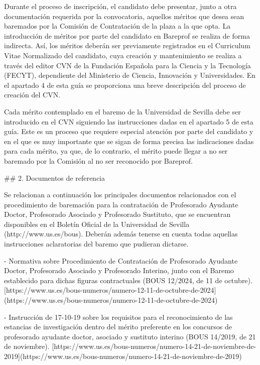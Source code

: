 \documentclass{article}
\begin{document}
\begin{itemize}
\begin{itemize}
\begin{scriptsize}
                  Durante el proceso de inscripción, el candidato debe presentar, junto a otra documentación requerida por la convocatoria, aquellos méritos que desea sean baremados por la Comisión de Contratación de la plaza a la que opta. La introducción de méritos por parte del candidato en Bareprof se realiza de forma indirecta. Así, los méritos deberán ser previamente registrados en el Curriculum Vitae Normalizado del candidato, cuya creación y mantenimiento se realiza a través del editor CVN de la Fundación Española para la Ciencia y la Tecnología (FECYT), dependiente del Ministerio de Ciencia, Innovación y Universidades. En el apartado 4 de esta guía se proporciona una breve descripción del proceso de creación del CVN.

                  Cada mérito contemplado en el baremo de la Universidad de Sevilla debe ser introducido en el CVN siguiendo las instrucciones dadas en el apartado 5 de esta guía. Este es un proceso que requiere especial atención por parte del candidato y en el que es muy importante que se sigan de forma precisa las indicaciones dadas para cada mérito, ya que, de lo contrario, el mérito puede llegar a no ser baremado por la Comisión al no ser reconocido por Bareprof.

                  \#\# 2. Documentos de referencia

                  Se relacionan a continuación los principales documentos relacionados con el procedimiento de baremación para la contratación de Profesorado Ayudante Doctor, Profesorado Asociado y Profesorado Sustituto, que se encuentran disponibles en el Boletín Oficial de la Universidad de Sevilla (http://www.us.es/bous). Deberán además tenerse en cuenta todas aquellas instrucciones aclaratorias del baremo que pudieran dictarse.

                  - Normativa sobre Procedimiento de Contratación de Profesorado Ayudante Doctor, Profesorado Asociado y Profesorado Interino, junto con el Baremo establecido para dichas figuras contractuales (BOUS 12/2024, de 11 de octubre).
                    [https://www.us.es/bous-numeros/numero-12-11-de-octubre-de-2024](https://www.us.es/bous-numeros/numero-12-11-de-octubre-de-2024)

                  - Instrucción de 17-10-19 sobre los requisitos para el reconocimiento de las estancias de investigación dentro del mérito preferente en los concursos de profesorado ayudante doctor, asociado y sustituto interino (BOUS 14/2019, de 21 de noviembre).
                    [https://www.us.es/bous-numeros/numero-14-21-de-noviembre-de-2019](https://www.us.es/bous-numeros/numero-14-21-de-noviembre-de-2019)


\end{scriptsize}
\end{itemize}
\end{itemize}
\end{document}
